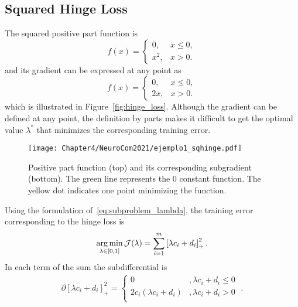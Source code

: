 \subsection{Squared Hinge Loss}
The squared positive part function is
\begin{equation}
    \nonumber
    f(x) = 
    \begin{cases}
    0 ,& x \leq 0, \\
    x^2 ,& x > 0    .
    \end{cases}
\end{equation}
and its gradient can be expressed at any point as
\begin{equation}
    \nonumber
    f(x) = 
    \begin{cases}
    0 ,& x \leq 0, \\
    2x ,& x > 0 .
    \end{cases}
\end{equation}
which is illustrated in Figure~\ref{fig:hinge_loss}.
Although the gradient can be defined at any point, the definition by parts makes it difficult to get the optimal value $\lambda^*$ that minimizes the corresponding training error.
\begin{figure}[t!]
    \centering
    \texttt{[image: Chapter4/NeuroCom2021/ejemplo1\_sqhinge.pdf]}
    \caption{Positive part function (top) and its corresponding subgradient (bottom). The green line represents the $0$ constant function. The yellow dot indicates one point minimizing the function.}
    \label{fig:sqhinge_loss}
\end{figure}
Using the formulation of~\eqref{eq:subproblem_lambda}, the training error corresponding to the hinge loss is
\begin{equation}
    \label{eq:opt_hinge_l2}
    \argmin_{\lambda \in [0, 1]} \mathcal{J}(\lambda) = \sum_{i=1}^{\npertask} \pospart{\lambda c_i + d_i}^2.
\end{equation}
In each term of the sum the subdifferential is 
\begin{equation}
    \label{eq:subdiff_hinge_l2}
    \begin{aligned}
        \partial \left[\lambda c_i + d_i \right]_+^2 = 
    \begin{cases}
        0 &, \lambda c_i + d_i  \leq 0 \\
        2 c_i (\lambda c_i + d_i) &, \lambda c_i + d_i  > 0 \\
    \end{cases} \; .
    \end{aligned}
\end{equation}
